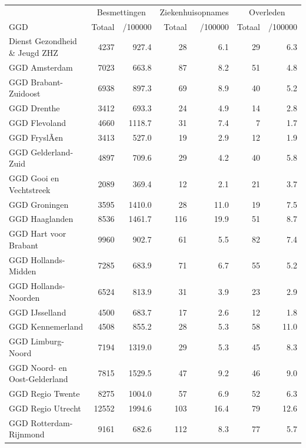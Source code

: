 \documentclass[
  english,
  man,floatsintext]{apa6}
\begin{document}
\begin{table}[H]
\centering\begingroup\fontsize{10}{12}\selectfont

\begin{threeparttable}
\begin{tabular}{lrrrrrr}
\toprule
\multicolumn{1}{c}{ } & \multicolumn{2}{c}{Besmettingen} & \multicolumn{2}{c}{Ziekenhuisopnames} & \multicolumn{2}{c}{Overleden} \\
\cmidrule(l{3pt}r{3pt}){2-3} \cmidrule(l{3pt}r{3pt}){4-5} \cmidrule(l{3pt}r{3pt}){6-7}
GGD & Totaal & /100000 & Totaal & /100000 & Totaal & /100000\\
\midrule
Dienst Gezondheid \& Jeugd ZHZ & 4237 & 927.4 & 28 & 6.1 & 29 & 6.3\\
GGD Amsterdam & 7023 & 663.8 & 87 & 8.2 & 51 & 4.8\\
GGD Brabant-Zuidoost & 6938 & 897.3 & 69 & 8.9 & 40 & 5.2\\
GGD Drenthe & 3412 & 693.3 & 24 & 4.9 & 14 & 2.8\\
GGD Flevoland & 4660 & 1118.7 & 31 & 7.4 & 7 & 1.7\\
GGD FryslÃ¢n & 3413 & 527.0 & 19 & 2.9 & 12 & 1.9\\
GGD Gelderland-Zuid & 4897 & 709.6 & 29 & 4.2 & 40 & 5.8\\
GGD Gooi en Vechtstreek & 2089 & 369.4 & 12 & 2.1 & 21 & 3.7\\
GGD Groningen & 3595 & 1410.0 & 28 & 11.0 & 19 & 7.5\\
GGD Haaglanden & 8536 & 1461.7 & 116 & 19.9 & 51 & 8.7\\
GGD Hart voor Brabant & 9960 & 902.7 & 61 & 5.5 & 82 & 7.4\\
GGD Hollands-Midden & 7285 & 683.9 & 71 & 6.7 & 55 & 5.2\\
GGD Hollands-Noorden & 6524 & 813.9 & 31 & 3.9 & 23 & 2.9\\
GGD IJsselland & 4500 & 683.7 & 17 & 2.6 & 12 & 1.8\\
GGD Kennemerland & 4508 & 855.2 & 28 & 5.3 & 58 & 11.0\\
GGD Limburg-Noord & 7194 & 1319.0 & 29 & 5.3 & 45 & 8.3\\
GGD Noord- en Oost-Gelderland & 7815 & 1529.5 & 47 & 9.2 & 46 & 9.0\\
GGD Regio Twente & 8275 & 1004.0 & 57 & 6.9 & 52 & 6.3\\
GGD Regio Utrecht & 12552 & 1994.6 & 103 & 16.4 & 79 & 12.6\\
GGD Rotterdam-Rijnmond & 9161 & 682.6 & 112 & 8.3 & 77 & 5.7\\

\end{tabular}
\end{threeparttable}
\end{table}
\end{document}

